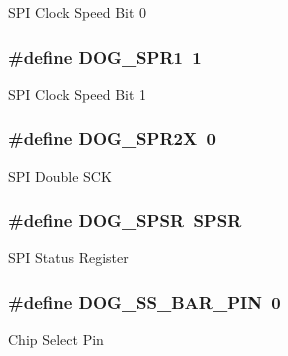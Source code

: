 S\-P\-I Clock Speed Bit 0 \hypertarget{group___d_o_g_m128__user__configuration_ga5e847553b02a6edd3d79d83b3b5bfb63}{
\subsubsection[{D\-O\-G\-\_\-\-S\-P\-R1}]{\setlength{\rightskip}{0pt plus 5cm}\#define D\-O\-G\-\_\-\-S\-P\-R1~1}}\label{group___d_o_g_m128__user__configuration_ga5e847553b02a6edd3d79d83b3b5bfb63}
S\-P\-I Clock Speed Bit 1 \hypertarget{group___d_o_g_m128__user__configuration_ga08f0f6a4202a88867afab73e4e53e2e2}{
\subsubsection[{D\-O\-G\-\_\-\-S\-P\-R2\-X}]{\setlength{\rightskip}{0pt plus 5cm}\#define D\-O\-G\-\_\-\-S\-P\-R2\-X~0}}\label{group___d_o_g_m128__user__configuration_ga08f0f6a4202a88867afab73e4e53e2e2}
S\-P\-I Double S\-C\-K \hypertarget{group___d_o_g_m128__user__configuration_ga276619987f64183ab549e7a3c590f2b0}{
\subsubsection[{D\-O\-G\-\_\-\-S\-P\-S\-R}]{\setlength{\rightskip}{0pt plus 5cm}\#define D\-O\-G\-\_\-\-S\-P\-S\-R~S\-P\-S\-R}}\label{group___d_o_g_m128__user__configuration_ga276619987f64183ab549e7a3c590f2b0}
S\-P\-I Status Register \hypertarget{group___d_o_g_m128__user__configuration_ga7dc422a18a3abc45c6d2661e22239ed1}{
\subsubsection[{D\-O\-G\-\_\-\-S\-S\-\_\-\-B\-A\-R\-\_\-\-P\-I\-N}]{\setlength{\rightskip}{0pt plus 5cm}\#define D\-O\-G\-\_\-\-S\-S\-\_\-\-B\-A\-R\-\_\-\-P\-I\-N~0}}\label{group___d_o_g_m128__user__configuration_ga7dc422a18a3abc45c6d2661e22239ed1}
Chip Select Pin 